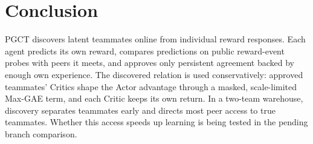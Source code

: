 \documentclass{article}
\begin{document}
\section{Conclusion}
PGCT discovers latent teammates online from individual reward responses. Each agent predicts its own reward, compares predictions on public reward-event probes with peers it meets, and approves only persistent agreement backed by enough own experience. The discovered relation is used conservatively: approved teammates' Critics shape the Actor advantage through a masked, scale-limited Max-GAE term, and each Critic keeps its own return. In a two-team warehouse, discovery separates teammates early and directs most peer access to true teammates. Whether this access speeds up learning is being tested in the pending branch comparison.



\end{document}
